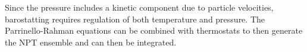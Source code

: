Since the pressure includes a kinetic component due to particle velocities, barostatting requires regulation of both temperature and pressure.
The Parrinello-Rahman equations can be combined with thermostats to then generate the NPT ensemble\cite{shinoda2004_nosehoover} and can then be integrated\cite{tuckerman2006_timeintegrator}.


